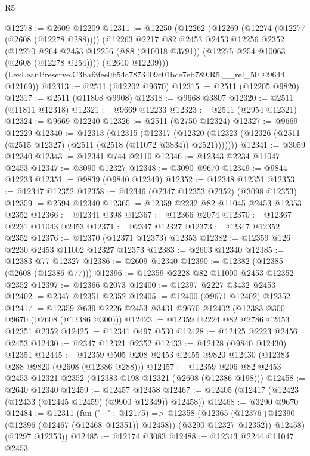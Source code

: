 \begin{lexlean}{R5}
\begin{coremodule}
@12278 := @2609 @12209
@12311 := @12250
    (@12262
      (@12269
        (@12274 (@12277 (@2608 (@12278 @288))))
        (@12263
          @2217
          @82
          @2453
          @2453
          @12256
          @2352
          (@12270 @264 @2453 @12256 (@88 (@10018 @3791)) (@12275 @254 @10063 (@2608 (@12278 @254))))
          (@2640 @12209)))
      (LexLeanPreserve.C3baf3fee0b54c7873409c01bce7eb789.R5.__rel_50 @9644 @12169))
@12313 := @2511 (@12202 @9670)
@12315 := @2511 (@12205 @9820)
@12317 := @2511 (@11808 @9908)
@12318 := @9668 @3807
@12320 := @2511 (@11811 @12318)
@12321 := @9669 @12233
@12323 := @2511 (@2954 @12321)
@12324 := @9669 @12240
@12326 := @2511 (@2750 @12324)
@12327 := @9669 @12229
@12340 := @12313
    (@12315
      (@12317
        (@12320 (@12323 (@12326 (@2511 (@2515 @12327) (@2511 (@2518 (@11072 @3834)) @2521)))))))
@12341 := @3059 @12340
@12343 := @12341 @744 @2110
@12346 := @12343 @2234 @11047 @2453
@12347 := @3090 @12327
@12348 := @3090 @9670
@12349 := @9844 @12233
@12351 := @9839 (@9840 @12349)
@12352 := @12348 @12351
@12353 := @12347 @12352
@12358 := @12346 (@2347 @12353 @2352) (@3098 @12353)
@12359 := @2594 @12340
@12365 := @12359 @2232 @82 @11045 @2453 @12353 @2352
@12366 := @12341 @398
@12367 := @12366 @2074
@12370 := @12367 @2231 @11043 @2453
@12371 := @2347 @12327
@12373 := @2347 @12352 @2352
@12376 := @12370 (@12371 @12373) @12353
@12382 := @12359 @126 @2230 @2453 @11002 @12327 @12373
@12383 := @2603 @12340
@12385 := @12383 @77 @12327
@12386 := @2609 @12340
@12390 := @12382 (@12385 (@2608 (@12386 @77)))
@12396 := @12359 @2228 @82 @11000 @2453 @12352 @2352
@12397 := @12366 @2073
@12400 := @12397 @2227 @3432 @2453
@12402 := @2347 @12351 @2352
@12405 := @12400 (@9671 @12402) @12352
@12417 := @12359 @639 @2226 @2453 @3431 @9670 @12402 (@12383 @300 @9670 (@2608 (@12386 @300)))
@12423 := @12359 @2224 @82 @2786 @2453 @12351 @2352
@12425 := @12341 @497 @530
@12428 := @12425 @2223 @2456 @2453
@12430 := @2347 @12321 @2352
@12433 := @12428 (@9840 @12430) @12351
@12445 := @12359 @505 @208 @2453 @2455 @9820 @12430 (@12383 @288 @9820 (@2608 (@12386 @288)))
@12457 := @12359 @206 @82 @2453 @2453 @12321 @2352 (@12383 @198 @12321 (@2608 (@12386 @198)))
@12458 := @2640 @12340
@12459 := @12457 @12458
@12467 := @12405 (@12417 (@12423 (@12433 (@12445 @12459) (@9900 @12349)) @12458))
@12468 := @3290 @9670
@12484 := @12311
    (fun ("_" : @12175) =>
    @12358
      (@12365
        (@12376 (@12390 (@12396 (@12467 (@12468 @12351)) @12458)) (@3290 @12327 @12352))
        @12458)
      (@3297 @12353))
@12485 := @12174 @3083
@12488 := @12343 @2244 @11047 @2453

\end{coremodule}
\end{lexlean}
